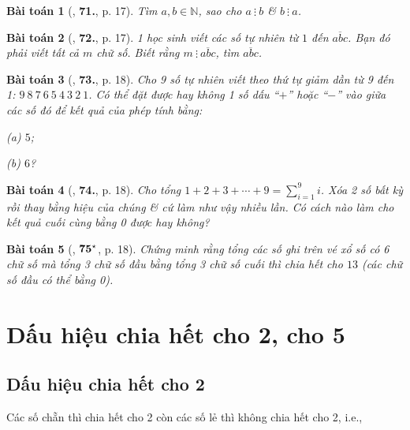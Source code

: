 \documentclass[oneside]{book}
\numberwithin{equation}{section}
\newtheorem{baitoan}{Bài toán}[section]
\begin{document}
\begin{baitoan}[\cite{Binh_Toan_6_tap_1}, \textbf{71.}, p. 17]
	Tìm $a,b\in\mathbb{N}$, sao cho $a\ \vdots\ b$ \& $b\ \vdots\ a$.
\end{baitoan}

\begin{baitoan}[\cite{Binh_Toan_6_tap_1}, \textbf{72.}, p. 17]
	1 học sinh viết các số tự nhiên từ $1$ đến $\overline{abc}$. Bạn đó phải viết tất cả $m$ chữ số. Biết rằng $m\ \vdots\ \overline{abc}$, tìm $\overline{abc}$.
\end{baitoan}

\begin{baitoan}[\cite{Binh_Toan_6_tap_1}, \textbf{73.}, p. 18]
	Cho 9 số tự nhiên viết theo thứ tự giảm dần từ 9 đến 1: $9\ 8\ 7\ 6\ 5\ 4\ 3\ 2\ 1$. Có thể đặt được hay không 1 số dấu ``$+$'' hoặc ``$-$'' vào giữa các số đó để kết quả của phép tính bằng:
	\begin{enumerate*}
		\item[(a)] $5$;
		\item[(b)] $6$?
	\end{enumerate*}
\end{baitoan}

\begin{baitoan}[\cite{Binh_Toan_6_tap_1}, \textbf{74.}, p. 18]
	Cho tổng $1 + 2 + 3 + \cdots + 9 = \sum_{i=1}^9 i$. Xóa 2 số bất kỳ rồi thay bằng hiệu của chúng \& cứ làm như vậy nhiều lần. Có cách nào làm cho kết quả cuối cùng bằng 0 được hay không?
\end{baitoan}

\begin{baitoan}[\cite{Binh_Toan_6_tap_1}, $\bf 75^\star$, p. 18]
	Chứng minh rằng tổng các số ghi trên vé xổ số có 6 chữ số mà tổng 3 chữ số đầu bằng tổng 3 chữ số cuối thì chia hết cho $13$ (các chữ số đầu có thể bằng 0).
\end{baitoan}


\section{Dấu hiệu chia hết cho 2, cho 5}

\subsection{Dấu hiệu chia hết cho 2}
Các số chẵn thì chia hết cho 2 còn các số lẻ thì không chia hết cho 2, i.e.,
\end{document}
